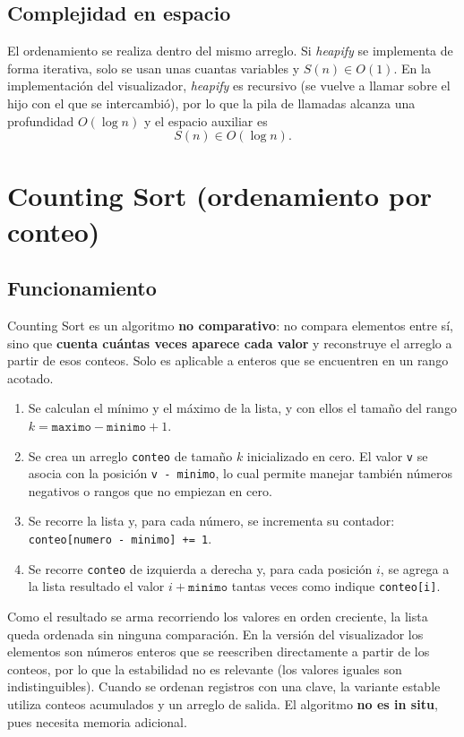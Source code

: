 \subsection{Complejidad en espacio}

El ordenamiento se realiza dentro del mismo arreglo. Si \emph{heapify} se implementa de forma iterativa, solo se usan unas cuantas variables y $S(n) \in O(1)$. En la implementación del visualizador, \emph{heapify} es recursivo (se vuelve a llamar sobre el hijo con el que se intercambió), por lo que la pila de llamadas alcanza una profundidad $O(\log n)$ y el espacio auxiliar es
\[
  S(n) \in O(\log n).
\]

\section{Counting Sort (ordenamiento por conteo)}

\subsection{Funcionamiento}

Counting Sort es un algoritmo \textbf{no comparativo}: no compara elementos entre sí, sino que \textbf{cuenta cuántas veces aparece cada valor} y reconstruye el arreglo a partir de esos conteos. Solo es aplicable a enteros que se encuentren en un rango acotado.

\begin{enumerate}
  \item Se calculan el mínimo y el máximo de la lista, y con ellos el tamaño del rango $k = \texttt{maximo} - \texttt{minimo} + 1$.
  \item Se crea un arreglo \texttt{conteo} de tamaño $k$ inicializado en cero. El valor \texttt{v} se asocia con la posición \texttt{v - minimo}, lo cual permite manejar también números negativos o rangos que no empiezan en cero.
  \item Se recorre la lista y, para cada número, se incrementa su contador: \texttt{conteo[numero - minimo] += 1}.
  \item Se recorre \texttt{conteo} de izquierda a derecha y, para cada posición $i$, se agrega a la lista resultado el valor $i + \texttt{minimo}$ tantas veces como indique \texttt{conteo[i]}.
\end{enumerate}

Como el resultado se arma recorriendo los valores en orden creciente, la lista queda ordenada sin ninguna comparación. En la versión del visualizador los elementos son números enteros que se reescriben directamente a partir de los conteos, por lo que la estabilidad no es relevante (los valores iguales son indistinguibles). Cuando se ordenan registros con una clave, la variante estable utiliza conteos acumulados y un arreglo de salida. El algoritmo \textbf{no es in situ}, pues necesita memoria adicional.

